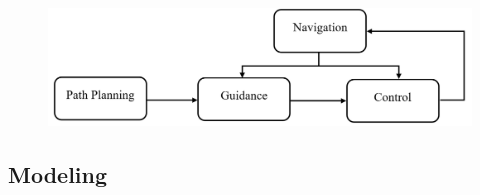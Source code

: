 \documentclass[numbered,pdftex]{ohio-etd}
\begin{document}

\begin{figure}[]
	\centering
	\includegraphics[width=0.7\linewidth]{PaperFigures/ngcFlow}
	\caption{}
	\label{fig:ngcflow}
\end{figure}



\subsection{Modeling}
%
\end{document}
